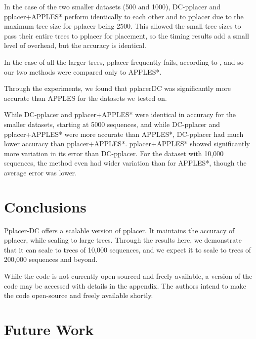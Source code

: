 \documentclass[10pt]{article}
\begin{document}
In the case of the two smaller datasets (500 and 1000), DC-pplacer and pplacer+APPLES* perform identically to each other and to pplacer due to the maximum tree size for pplacer being 2500. This allowed the small tree sizes to pass their entire trees to pplacer for placement, so the timing results add a small level of overhead, but the accuracy is identical.

In the case of all the larger trees, pplacer frequently fails, according to \cite{balaban_apples_2020}, and so our two methods were compared only to APPLES*.

Through the experiments, we found that pplacerDC was significantly more accurate than APPLES for the datasets we tested on.

While DC-pplacer and pplacer+APPLES* were identical in accuracy for the smaller datasets, starting at 5000 sequences, and while DC-pplacer and pplacer+APPLES* were more accurate than APPLES*, DC-pplacer had much lower accuracy than pplacer+APPLES*. pplacer+APPLES* showed significantly more variation in its error than DC-pplacer. For the dataset with 10,000 sequences, the method even had wider variation than for APPLES*, though the average error was lower.


\section{Conclusions}

Pplacer-DC offers a scalable version of pplacer. It maintains the accuracy of pplacer, while scaling to large trees. Through the results here, we demonstrate that it can scale to trees of 10,000 sequences, and we expect it to scale to trees of 200,000 sequences and beyond.

While the code is not currently open-sourced and freely available, a version of the code
may be accessed with details in the appendix.
The authors intend to make the code open-source and freely available shortly.

\section{Future Work}
\end{document}
